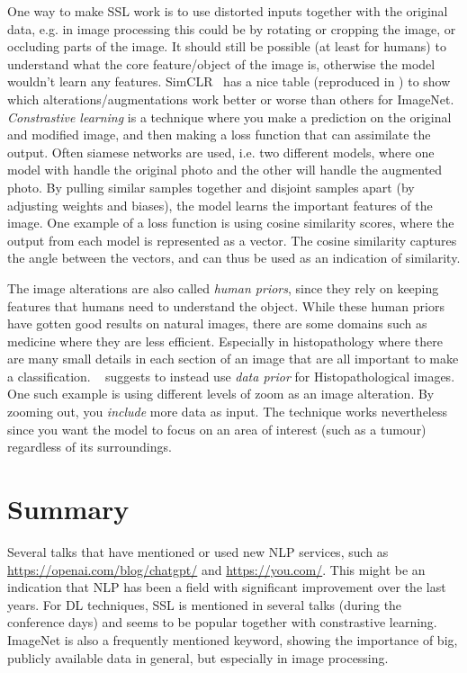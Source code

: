 \documentclass[10pt,twocolumn,letterpaper]{article}
\begin{document}
One way to make \gls{SSL} work is to use distorted inputs together with the original data, e.g. in image processing this could be by rotating or cropping the image, or occluding parts of the image. It should still be possible (at least for humans) to understand what the core feature/object of the image is, otherwise the model wouldn't learn any features. SimCLR~\cite{simCLR} has a nice table (reproduced in ) to show which alterations/augmentations work better or worse than others for ImageNet. \textit{Constrastive learning} is a technique where you make a prediction on the original and modified image, and then making a loss function that can assimilate the output. Often siamese networks are used, i.e. two different models, where one model with handle the original photo and the other will handle the augmented photo. By pulling similar samples together and disjoint samples apart (by adjusting weights and biases), the model learns the important features of the image. One example of a loss function is using cosine similarity scores, where the output from each model is represented as a vector. The cosine similarity captures the angle between the vectors, and can thus be used as an indication of similarity. 

The image alterations are also called \textit{human priors}, since they rely on keeping features that humans need to understand the object. While these human priors have gotten good results on natural images, there are some domains such as medicine where they are less efficient. Especially in histopathology where there are many small details in each section of an image that are all important to make a classification. ~\cite{dataPriors} suggests to instead use \textit{data prior} for Histopathological images. One such example is using different levels of zoom as an image alteration. By zooming out, you \textit{include} more data as input. The technique works nevertheless since you want the model to focus on an area of interest (such as a tumour) regardless of its surroundings.

\section{Summary}\label{sec:summary}
Several talks that have mentioned or used new \gls{NLP} services, such as \href{ChatGPT}{https://openai.com/blog/chatgpt/} and \href{https://you.com/}{https://you.com/}. This might be an indication that \gls{NLP} has been a field with significant improvement over the last years. For \gls{DL} techniques, \gls{SSL} is mentioned in several talks (during the conference days) and seems to be popular together with constrastive learning. ImageNet is also a frequently mentioned keyword, showing the importance of big, publicly available data in general, but especially in image processing.
\end{document}

